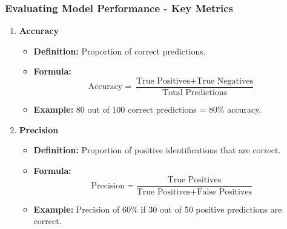 \documentclass[aspectratio=169]{beamer}
\begin{document}
\begin{frame}[fragile]
    \frametitle{Evaluating Model Performance - Key Metrics}
    \begin{enumerate}
        \item \textbf{Accuracy}
        \begin{itemize}
            \item \textbf{Definition:} Proportion of correct predictions.
            \item \textbf{Formula:}
            \[
            \text{Accuracy} = \frac{\text{True Positives} + \text{True Negatives}}{\text{Total Predictions}}
            \]
            \item \textbf{Example:} 80 out of 100 correct predictions = 80\% accuracy.
        \end{itemize}

        \item \textbf{Precision}
        \begin{itemize}
            \item \textbf{Definition:} Proportion of positive identifications that are correct.
            \item \textbf{Formula:}
            \[
            \text{Precision} = \frac{\text{True Positives}}{\text{True Positives} + \text{False Positives}}
            \]
            \item \textbf{Example:} Precision of 60\% if 30 out of 50 positive predictions are correct.
        \end{itemize}
    \end{enumerate}
\end{frame}
\end{document}

